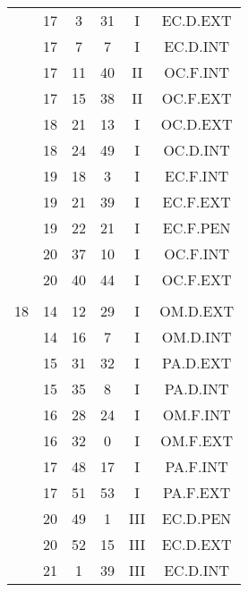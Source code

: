 \documentclass[12pt, a4paper]{article}
\begin{document}
\begin{multicols}{3}
{\begin{tabular}{c c c c c c}
	 	 	 	 & 17 & 3 & 31 & I & EC.D.EXT\\%
	 	 	 	 & 17 & 7 & 7 & I & EC.D.INT\\%
	 	 	 	 & 17 & 11 & 40 & II & OC.F.INT\\%
	 	 	 	 & 17 & 15 & 38 & II & OC.F.EXT\\%
	 	 	 	 & 18 & 21 & 13 & I & OC.D.EXT\\%
	 	 	 	 & 18 & 24 & 49 & I & OC.D.INT\\%
	 	 	 	 & 19 & 18 & 3 & I & EC.F.INT\\%
	 	 	 	 & 19 & 21 & 39 & I & EC.F.EXT\\%
	 	 	 	 & 19 & 22 & 21 & I & EC.F.PEN\\%
	 	 	 	 & 20 & 37 & 10 & I & OC.F.INT\\%
	 	 	 	 & 20 & 40 & 44 & I & OC.F.EXT\\%
	 	 	 	 & & & & & \\%
	 	 	 	18 & 14 & 12 & 29 & I & OM.D.EXT\\%
	 	 	 	 & 14 & 16 & 7 & I & OM.D.INT\\%
	 	 	 	 & 15 & 31 & 32 & I & PA.D.EXT\\%
	 	 	 	 & 15 & 35 & 8 & I & PA.D.INT\\%
	 	 	 	 & 16 & 28 & 24 & I & OM.F.INT\\%
	 	 	 	 & 16 & 32 & 0 & I & OM.F.EXT\\%
	 	 	 	 & 17 & 48 & 17 & I & PA.F.INT\\%
	 	 	 	 & 17 & 51 & 53 & I & PA.F.EXT\\%
	 	 	 	 & 20 & 49 & 1 & III & EC.D.PEN\\%
	 	 	 	 & 20 & 52 & 15 & III & EC.D.EXT\\%
	 	 	 	 & 21 & 1 & 39 & III & EC.D.INT\\%

\end{tabular}}
\end{multicols}
\end{document}
